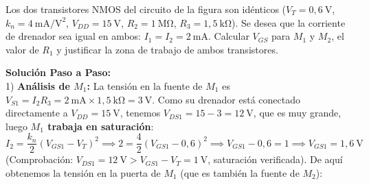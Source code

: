 \begin{ejercicio}
Los dos transistores NMOS del circuito de la figura son idénticos ($V_T = 0{,}6\ \si{\volt}$, $k_n = 4\ \si{\milli\ampere\per\volt\squared}$, $V_{DD} = 15\ \si{\volt}$, $R_2 = 1\ \si{\mega\ohm}$, $R_3 = 1{,}5\ \si{\kilo\ohm}$). Se desea que la corriente de drenador sea igual en ambos: $I_1 = I_2 = 2\ \si{\milli\ampere}$. Calcular $V_{GS}$ para $M_1$ y $M_2$, el valor de $R_1$ y justificar la zona de trabajo de ambos transistores.
\tcbline
\begin{center}
\end{center}
\textbf{Solución Paso a Paso:}\\[4pt]
1) \textbf{Análisis de $M_1$:} La tensión en la fuente de $M_1$ es $V_{S1} = I_2 R_3 = 2\ \si{\milli\ampere} \times 1{,}5\ \si{\kilo\ohm} = 3\ \si{\volt}$. Como su drenador está conectado directamente a $V_{DD} = 15\ \si{\volt}$, tenemos $V_{DS1} = 15 - 3 = 12\ \si{\volt}$, que es muy grande, luego \textbf{$M_1$ trabaja en saturación}:
\begin{equation}
    I_2 = \frac{k_n}{2}(V_{GS1} - V_T)^2 \implies 2 = \frac{4}{2}(V_{GS1} - 0{,}6)^2 \implies V_{GS1} - 0{,}6 = 1 \implies V_{GS1} = 1{,}6\ \si{\volt}
\end{equation}
(Comprobación: $V_{DS1} = 12\ \si{\volt} > V_{GS1} - V_T = 1\ \si{\volt}$, saturación verificada).
De aquí obtenemos la tensión en la puerta de $M_1$ (que es también la fuente de $M_2$):
\begin{equation}

\end{equation}
\end{ejercicio}
